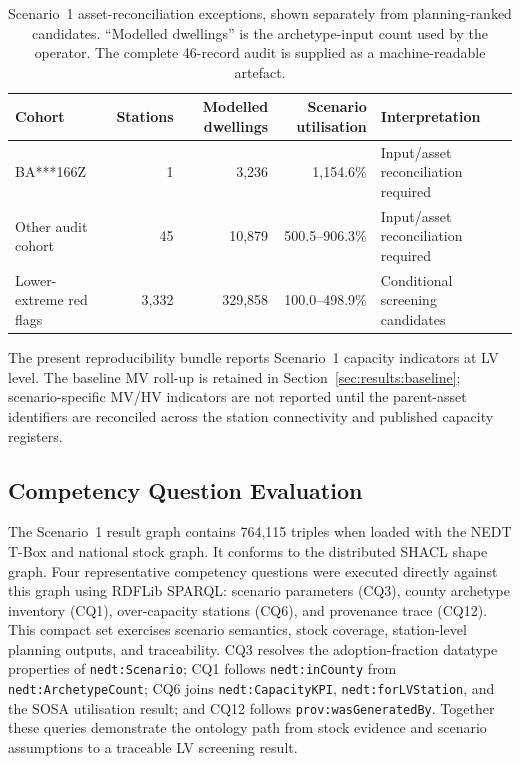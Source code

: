 \documentclass[preprint,12pt]{elsarticle}
\begin{document}
\begin{table}[H]
\centering
\caption{Scenario~1 asset-reconciliation exceptions, shown separately from
  planning-ranked candidates. ``Modelled dwellings'' is the archetype-input
  count used by the operator. The complete 46-record audit is supplied as a
  machine-readable artefact.}
\label{tab:lv_reconciliation_exceptions}
\small
\begin{tabularx}{\textwidth}{XrrrX}
\toprule
\textbf{Cohort} & \textbf{Stations} & \textbf{Modelled dwellings} &
  \textbf{Scenario utilisation} & \textbf{Interpretation} \\
\midrule
BA***166Z & 1 & 3{,}236 & 1{,}154.6\% & Input/asset reconciliation required \\
Other audit cohort & 45 & 10{,}879 & 500.5--906.3\% & Input/asset reconciliation required \\
Lower-extreme red flags & 3{,}332 & 329{,}858 & 100.0--498.9\% & Conditional screening candidates \\
\bottomrule
\end{tabularx}
\end{table}

The present reproducibility bundle reports Scenario~1 capacity indicators at
LV level. The baseline MV roll-up is retained in
Section~\ref{sec:results:baseline}; scenario-specific MV/HV indicators are
not reported until the parent-asset identifiers are reconciled across the
station connectivity and published capacity registers.

\subsection{Competency Question Evaluation}
\label{sec:results:performance}

The Scenario~1 result graph contains 764,115 triples when loaded with the
NEDT T-Box and national stock graph. It conforms to the distributed SHACL
shape graph. Four representative competency questions were executed directly
against this graph using RDFLib SPARQL: scenario parameters (CQ3), county
archetype inventory (CQ1), over-capacity stations (CQ6), and provenance trace
(CQ12). This compact set exercises scenario semantics, stock coverage,
station-level planning outputs, and traceability.
CQ3 resolves the adoption-fraction datatype properties of
\texttt{nedt:Scenario}; CQ1 follows \texttt{nedt:inCounty} from
\texttt{nedt:ArchetypeCount}; CQ6 joins \texttt{nedt:CapacityKPI},
\texttt{nedt:forLVStation}, and the SOSA utilisation result; and CQ12 follows
\texttt{prov:wasGeneratedBy}. Together these queries demonstrate the
ontology path from stock evidence and scenario assumptions to a traceable LV
screening result.
\end{document}
